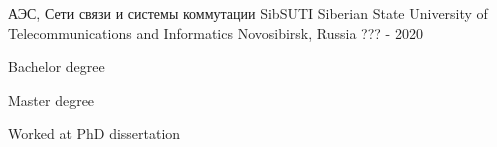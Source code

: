 

\begin{cventries}

  \cventry
    {АЭС, Сети связи и системы коммутации} %
    {SibSUTI Siberian State University of Telecommunications and Informatics} %
    {Novosibirsk, Russia} %
    {??? - 2020} %
    {
      \begin{cvitems} %
        \item {Bachelor degree}
        \item {Master degree}
        \item {Worked at PhD dissertation}
      \end{cvitems}
    }
\end{cventries}

